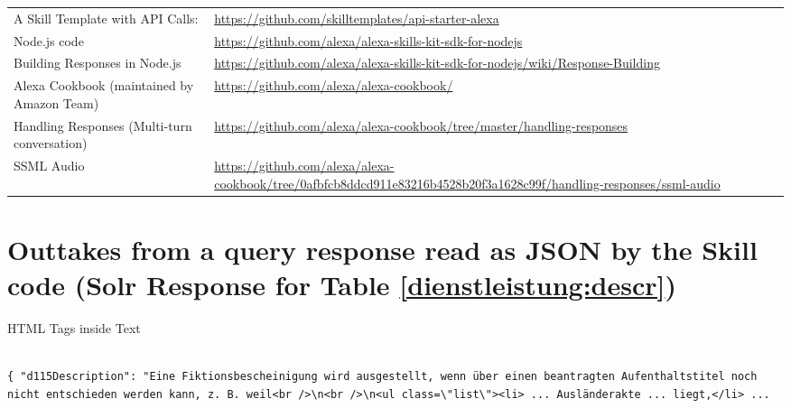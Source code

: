 \begin{flushleft}
	\begin{tabu} to \textwidth {X | X[2]}
		
		
A Skill Template with API Calls: & 
\url{https://github.com/skilltemplates/api-starter-alexa}\\

Node.js code &
\url{https://github.com/alexa/alexa-skills-kit-sdk-for-nodejs}\\

Building Responses in Node.js & 
\url{https://github.com/alexa/alexa-skills-kit-sdk-for-nodejs/wiki/Response-Building}\\


Alexa Cookbook (maintained by Amazon Team) & 
\url{https://github.com/alexa/alexa-cookbook/}\\

Handling Responses (Multi-turn conversation) & 
\url{https://github.com/alexa/alexa-cookbook/tree/master/handling-responses}\\
		
SSML Audio & 
\url{https://github.com/alexa/alexa-cookbook/tree/0afbfcb8ddcd911e83216b4528b20f3a1628c99f/handling-responses/ssml-audio}\\
		
	\end{tabu}
\end{flushleft}







\clearpage

\section*{Outtakes from a query response read as JSON by the Skill code (Solr Response for Table \ref{dienstleistung:descr})}
\label{query:dl}

HTML Tags inside Text
\begin{verbatim}

{ "d115Description": "Eine Fiktionsbescheinigung wird ausgestellt, wenn über einen beantragten Aufenthaltstitel noch nicht entschieden werden kann, z. B. weil<br />\n<br />\n<ul class=\"list\"><li> ... Ausländerakte ... liegt,</li> ...
\end{verbatim}

